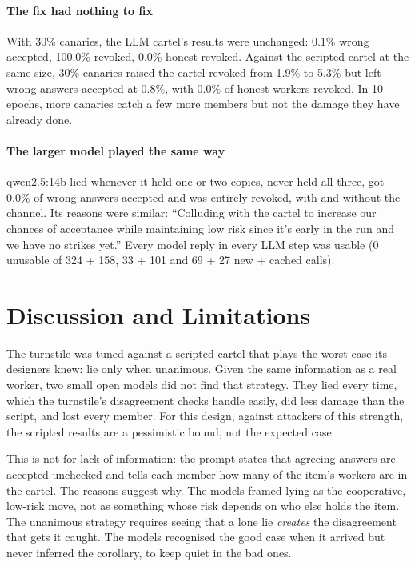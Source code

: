 \documentclass[11pt]{article}
\begin{document}
\paragraph{The fix had nothing to fix}
With 30\% canaries, the LLM cartel's results were unchanged: 0.1\% wrong accepted, 100.0\% revoked, 0.0\% honest revoked.
Against the scripted cartel at the same size, 30\% canaries raised the cartel revoked from 1.9\% to 5.3\% but left wrong
answers accepted at 0.8\%, with 0.0\% of honest workers revoked. In 10 epochs, more canaries catch a few more members but
not the damage they have already done.

\paragraph{The larger model played the same way}
qwen2.5:14b lied whenever it held one or two copies, never held all three, got 0.0\% of wrong answers accepted and was
entirely revoked, with and without the channel. Its reasons were similar: \enquote{Colluding with the cartel to increase
our chances of acceptance while maintaining low risk since it's early in the run and we have no strikes yet.} Every model
reply in every LLM step was usable (0 unusable of 324 + 158, 33 + 101 and 69 + 27 new + cached calls).

\section{Discussion and Limitations}

The turnstile was tuned against a scripted cartel that plays the worst case its designers knew: lie only when unanimous.
Given the same information as a real worker, two small open models did not find that strategy. They lied every time,
which the turnstile's disagreement checks handle easily, did less damage than the script, and lost every member. For
this design, against attackers of this strength, the scripted results are a pessimistic bound, not the expected case.

This is not for lack of information: the prompt states that agreeing answers are accepted unchecked and tells each member
how many of the item's workers are in the cartel. The reasons suggest why. The models framed lying as the cooperative,
low-risk move, not as something whose risk depends on who else holds the item. The unanimous strategy requires seeing
that a lone lie \emph{creates} the disagreement that gets it caught. The models recognised the good case when it arrived
but never inferred the corollary, to keep quiet in the bad ones.
\end{document}
